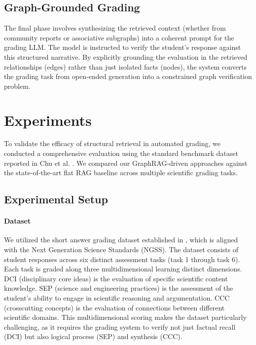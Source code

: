 \documentclass{edm_article}
\begin{document}
\subsection{Graph-Grounded Grading}
The final phase involves synthesizing the retrieved context (whether from community reports or associative subgraphs) into a coherent prompt for the grading LLM. The model is instructed to verify the student's response against this structured narrative. By explicitly grounding the evaluation in the retrieved relationships (edges) rather than just isolated facts (nodes), the system converts the grading task from open-ended generation into a constrained graph verification problem.


\section{Experiments}

To validate the efficacy of structural retrieval in automated grading, we conducted a comprehensive evaluation using the standard benchmark dataset reported in Chu et al. \cite{chu2025enhancing}. We compared our GraphRAG-driven approaches against the state-of-the-art flat RAG baseline across multiple scientific grading tasks.


\subsection{Experimental Setup}

\paragraph{Dataset}
We utilized the short answer grading dataset established in \cite{chu2025enhancing}, which is aligned with the Next Generation Science Standards (NGSS). The dataset consists of student responses across six distinct assessment tasks (task 1 through task 6). Each task is graded along three multidimensional learning distinct dimensions. DCI (disciplinary core ideas) is the evaluation of specific scientific content knowledge. SEP (science and engineering practices) is the assessment of the student's ability to engage in scientific reasoning and argumentation. CCC (crosscutting concepts) is the evaluation of connections between different scientific domains.
This multidimensional scoring makes the dataset particularly challenging, as it requires the grading system to verify not just factual recall (DCI) but also logical process (SEP) and synthesis (CCC).
\end{document}
